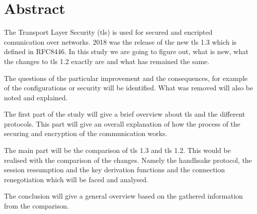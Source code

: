 \chapter*{Abstract}
\label{chap:abstract}
The Transport Layer Security (\gls{tls}) is used for secured and encripted comunication over networks. 2018 was the release of the new \gls{tls} 1.3 which is defined in RFC8446. In this study we are going to figure out, what is new, what the changes to \gls{tls} 1.2 exactly are and what has remained the same. 

The questions of the particular improvement and the consequences, for example of the configurations or security will be identified. What was removed will also be noted and explained.

The first part of the study will give a brief overview about \gls{tls} and the different protocols. This part will give an overall explanation of how the process of the securing and encryption of the communication works. 

The main part will be the comparison of \gls{tls} 1.3 and \gls{tls} 1.2. This would be realised with the comparison of the changes. Namely the handhsake protocol, the session ressumption and the key derivation functions and the connection renegotiation which will be faced and analysed.

The conclusion will give a general overview based on the gathered information from the comparison.



